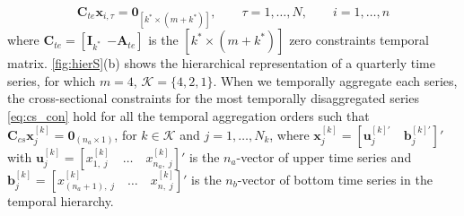 \documentclass[a4paper,11pt]{article}
\newcommand{\bvet}{\bm{b}}
\newcommand{\uvet}{\bm{u}}
\newcommand{\xvet}{\bm{x}}
\newcommand{\Avet}{\bm{A}}
\newcommand{\Cvet}{\bm{C}}
\newcommand{\Ivet}{\bm{I}}
\newcommand{\Svet}{\bm{S}}
\newcommand{\Zerovet}{\bm{0}}
\theoremstyle{definition}
\begin{document}
\begin{equation}
	\label{eq:te_con}
	\Cvet_{te}\xvet_{i,\tau} = \Zerovet_{[k^\ast \times (m+k^\ast)]}, \qquad \tau = 1,\dots,N, \qquad i = 1,\dots, n
\end{equation}
where $\Cvet_{te} = [\Ivet_{k^\ast} ~~ {-\Avet_{te}}]$ is the $[k^\ast \times (m+k^\ast)]$ zero constraints temporal matrix. \autoref{fig:hierS}(b) shows the hierarchical representation of a quarterly time series, for which $m = 4$, $\mathcal{K} = \{4,2,1\}$.%
When we temporally aggregate each series, the cross-sectional constraints for the most temporally disaggregated series \eqref{eq:cs_con} hold for all the temporal aggregation orders such that $\Cvet_{cs}\xvet^{[k]}_j = \Zerovet_{(n_a \times 1)}$, for $k \in \mathcal{K}$ and $j = 1, \dots, N_k$, where $\xvet_j^{[k]} = \left[\uvet_j^{[k]\prime}\quad \bvet_j^{[k]\prime}\right]'$ with $\uvet^{[k]}_j = \left[ x^{[k]}_{1,\;j}\quad \dots\quad x^{[k]}_{n_a,\;j}\right]'$ is the $n_a$-vector of upper time series and $\bvet^{[k]}_j = \left[x^{[k]}_{(n_a+1),\;j}\quad\dots\quad x^{[k]}_{n,\;j}\right]'$ is the $n_b$-vector of bottom time series in the temporal hierarchy.
\end{document}
